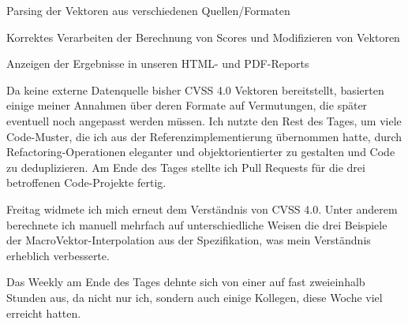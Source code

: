 \begin{smitemize}
    \item Parsing der Vektoren aus verschiedenen Quellen/Formaten
    \item Korrektes Verarbeiten der Berechnung von Scores und Modifizieren von Vektoren
    \item Anzeigen der Ergebnisse in unseren HTML- und PDF-Reports
\end{smitemize}

Da keine externe Datenquelle bisher CVSS 4.0 Vektoren bereitstellt, basierten einige meiner Annahmen über deren Formate auf Vermutungen, die später eventuell noch angepasst werden müssen.
Ich nutzte den Rest des Tages, um viele Code-Muster, die ich aus der Referenzimplementierung übernommen hatte, durch Refactoring-Operationen eleganter und objektorientierter zu gestalten und Code zu deduplizieren.
Am Ende des Tages stellte ich Pull Requests für die drei betroffenen Code-Projekte fertig.

\sweekdaymarginpar{\weekdayFridayLong}

Freitag widmete ich mich erneut dem Verständnis von CVSS 4.0.
Unter anderem berechnete ich manuell mehrfach auf unterschiedliche Weisen die drei Beispiele der MacroVektor-Interpolation aus der Spezifikation, was mein Verständnis erheblich verbesserte.

Das Weekly am Ende des Tages dehnte sich von einer auf fast zweieinhalb Stunden aus, da nicht nur ich, sondern auch einige Kollegen, diese Woche viel erreicht hatten.
